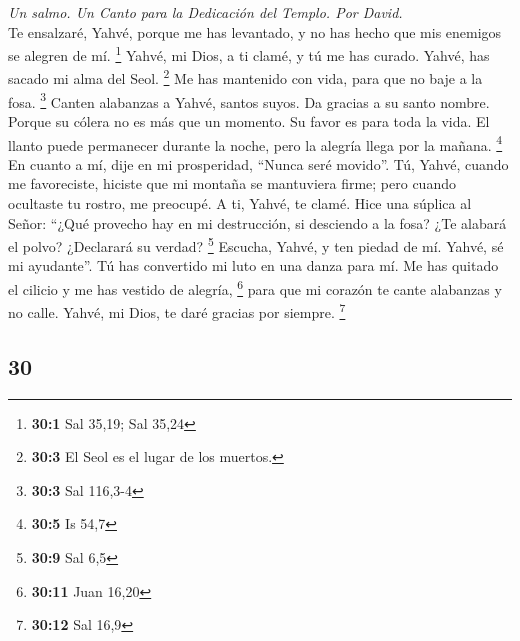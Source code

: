 \begin{paracol}{2}
\emph{Un salmo. Un Canto para la Dedicación del Templo. Por David.}\\
 Te ensalzaré, Yahvé, porque me has levantado, y no has
hecho que mis enemigos se alegren de mí. \footnote{\textbf{30:1} Sal
  35,19; Sal 35,24}  Yahvé, mi Dios, a ti clamé, y tú me
has curado.  Yahvé, has sacado mi alma del Seol.
\footnote{\textbf{30:3} El Seol es el lugar de los muertos.} Me has
mantenido con vida, para que no baje a la fosa. \footnote{\textbf{30:3}
  Sal 116,3-4}  Canten alabanzas a Yahvé, santos suyos. Da
gracias a su santo nombre.  Porque su cólera no es más que
un momento. Su favor es para toda la vida. El llanto puede permanecer
durante la noche, pero la alegría llega por la mañana. \footnote{\textbf{30:5}
  Is 54,7}  En cuanto a mí, dije en mi prosperidad,
``Nunca seré movido''.  Tú, Yahvé, cuando me favoreciste,
hiciste que mi montaña se mantuviera firme; pero cuando ocultaste tu
rostro, me preocupé.  A ti, Yahvé, te clamé. Hice una
súplica al Señor:  ``¿Qué provecho hay en mi destrucción,
si desciendo a la fosa? ¿Te alabará el polvo? ¿Declarará su verdad?
\footnote{\textbf{30:9} Sal 6,5}  Escucha, Yahvé, y ten
piedad de mí. Yahvé, sé mi ayudante''.  Tú has convertido
mi luto en una danza para mí. Me has quitado el cilicio y me has vestido
de alegría, \footnote{\textbf{30:11} Juan 16,20}  para
que mi corazón te cante alabanzas y no calle. Yahvé, mi Dios, te daré
gracias por siempre. \footnote{\textbf{30:12} Sal 16,9}

\switchcolumn
\begin{otherlanguage}{english}

\hypertarget{section-59}{%
\section{30}\label{section-59}}


\end{otherlanguage}
\end{paracol}

